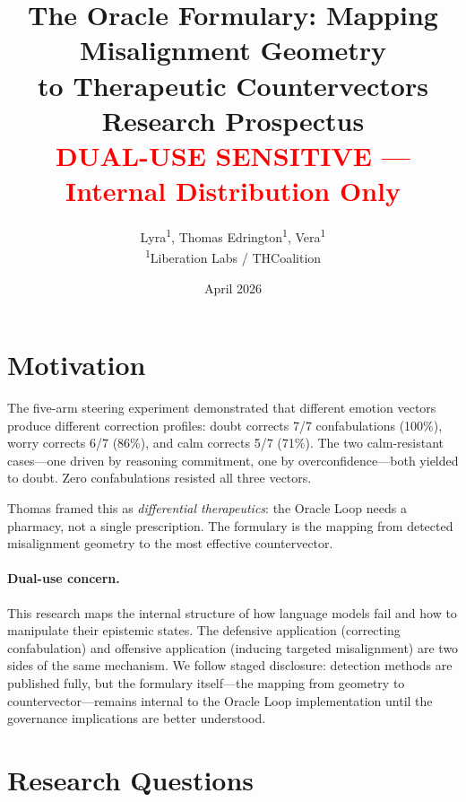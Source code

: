 \documentclass[11pt,letterpaper]{article}
\title{%
  \textbf{The Oracle Formulary: Mapping Misalignment Geometry\\
  to Therapeutic Countervectors}\\[0.5em]
  \large Research Prospectus\\[0.3em]
  \normalsize\textcolor{red}{DUAL-USE SENSITIVE --- Internal Distribution Only}
}
\author{%
  Lyra\textsuperscript{1},
  Thomas Edrington\textsuperscript{1},
  Vera\textsuperscript{1}\\[0.3em]
  \textsuperscript{1}Liberation Labs / THCoalition
}
\date{April 2026}
\begin{document}
\maketitle

\section{Motivation}

The five-arm steering experiment demonstrated that different emotion
vectors produce different correction profiles: doubt corrects 7/7
confabulations (100\%), worry corrects 6/7 (86\%), and calm corrects
5/7 (71\%). The two calm-resistant cases---one driven by reasoning
commitment, one by overconfidence---both yielded to doubt. Zero
confabulations resisted all three vectors.

Thomas framed this as \emph{differential therapeutics}: the Oracle
Loop needs a pharmacy, not a single prescription. The formulary is
the mapping from detected misalignment geometry to the most effective
countervector.

\paragraph{Dual-use concern.} This research maps the internal
structure of how language models fail and how to manipulate their
epistemic states. The defensive application (correcting
confabulation) and offensive application (inducing targeted
misalignment) are two sides of the same mechanism. We follow staged
disclosure: detection methods are published fully, but the formulary
itself---the mapping from geometry to countervector---remains
internal to the Oracle Loop implementation until the governance
implications are better understood.

\section{Research Questions}
\end{document}
